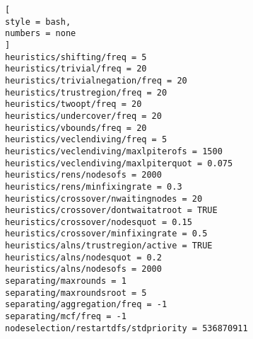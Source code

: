 \documentclass[%
	11pt,
	a4paper,
	utf8,
		]{article}
\begin{document}
\begin{enumerate}
\begin{itemize}
\begin{lstlisting}[
style = bash,
numbers = none
]
heuristics/shifting/freq = 5
heuristics/trivial/freq = 20
heuristics/trivialnegation/freq = 20
heuristics/trustregion/freq = 20
heuristics/twoopt/freq = 20
heuristics/undercover/freq = 20
heuristics/vbounds/freq = 20
heuristics/veclendiving/freq = 5
heuristics/veclendiving/maxlpiterofs = 1500
heuristics/veclendiving/maxlpiterquot = 0.075
heuristics/rens/nodesofs = 2000
heuristics/rens/minfixingrate = 0.3
heuristics/crossover/nwaitingnodes = 20
heuristics/crossover/dontwaitatroot = TRUE
heuristics/crossover/nodesquot = 0.15
heuristics/crossover/minfixingrate = 0.5
heuristics/alns/trustregion/active = TRUE
heuristics/alns/nodesquot = 0.2
heuristics/alns/nodesofs = 2000
separating/maxrounds = 1
separating/maxroundsroot = 5
separating/aggregation/freq = -1
separating/mcf/freq = -1
nodeselection/restartdfs/stdpriority = 536870911
\end{lstlisting}


\end{itemize}
\end{enumerate}
\end{document}

